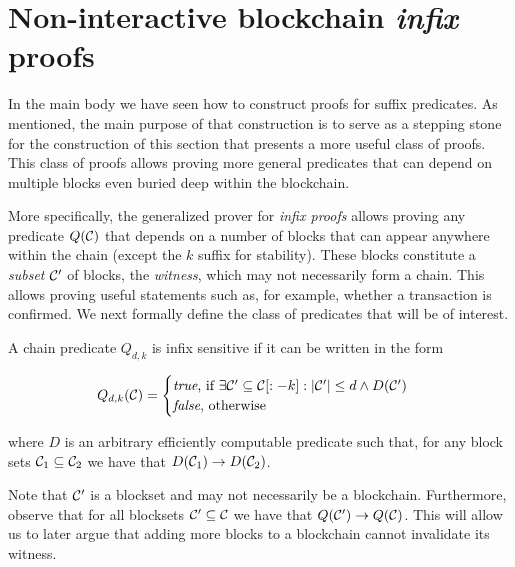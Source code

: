 \section{Non-interactive blockchain \emph{infix} proofs}
\label{sec:infix}

In the main body we have seen how to construct proofs for suffix
predicates. As mentioned, the main purpose of that construction is to serve as a
stepping stone for the construction of this section that presents a more useful
class of proofs. This class of proofs allows proving more general predicates
that can depend on multiple blocks even buried deep within the blockchain.

More specifically, the generalized prover for \emph{infix proofs} allows
proving any predicate $Q(\mathcal{C})$ that depends on a number of blocks that can
appear anywhere within the chain (except the $k$ suffix for stability). These
blocks constitute a \emph{subset} $\mathcal{C}'$ of blocks, the \emph{witness},
which may not necessarily form a chain. This allows proving useful statements
such as, for example, whether a transaction is confirmed. We next formally
define the class of predicates that will be of interest.

\begin{definition}
\label{def:infix}
A chain predicate $Q_{d,k}$ is \textnormal{infix sensitive} if it can be
written in the form

$$
Q_{d,k}(\mathcal{C}) =
\begin{cases}
  \text{\emph{true}, if }
    \exists \mathcal{C}' \subseteq \mathcal{C}[:-k]: |\mathcal{C}'| \leq d \land D(\mathcal{C}')\\
  \text{\emph{false}, otherwise}
\end{cases}
$$

where $D$ is an arbitrary efficiently computable predicate such that, for any
block sets $\mathcal{C}_1 \subseteq \mathcal{C}_2$ we have that
$D(\mathcal{C}_1) \rightarrow D(\mathcal{C}_2)$.
\end{definition}

Note that $\mathcal{C}'$ is a blockset and may not necessarily be a blockchain.
Furthermore, observe that for all blocksets $\mathcal{C}' \subseteq \mathcal{C}$ we have
that $Q(\mathcal{C}') \rightarrow Q(\mathcal{C})$. This will allow us to later argue that
adding more blocks to a blockchain cannot invalidate its witness.

